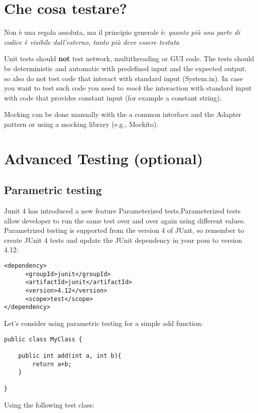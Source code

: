 \documentclass{article}
\begin{document}
\section{Che cosa testare?}
Non \`e una regola assoluta, ma il principio generale \`e: \emph{quanto pi\`u una parte di codice \`e visibile dall'esterno, tanto pi\`u deve essere testata}

Unit tests should \textbf{not} test network, multithreading or GUI code.
The tests should be deterministic and automatic with predefined input
and the expected output, so also do not test code that interact with
standard input (System.in). In case you want to test such code you need to
\emph{mock} the interaction with standard input with code
that provides constant input (for example a constant string). 

Mocking can be done manually with the a common interface and the
Adapter pattern or using a mocking library (e.g., Mockito).

\section{Advanced Testing (optional)}

\subsection{Parametric testing}


Junit 4 has introduced a new feature Parameterized tests.Parameterized
tests allow developer to run the same test over and over again using
different values.
Parametrized testing is supported from the version 4 of JUnit, so
remember to create JUnit 4 tests and update the JUnit dependency in
your pom to version 4.12:

\begin{lstlisting}
<dependency>
      <groupId>junit</groupId>
      <artifactId>junit</artifactId>
      <version>4.12</version>
      <scope>test</scope>
</dependency>
\end{lstlisting}

Let's consider using parametric testing for a simple add function:

\begin{lstlisting}
public class MyClass {

	public int add(int a, int b){
		return a+b;
	}
	
}
\end{lstlisting}

Using the following test class:
\end{document}
